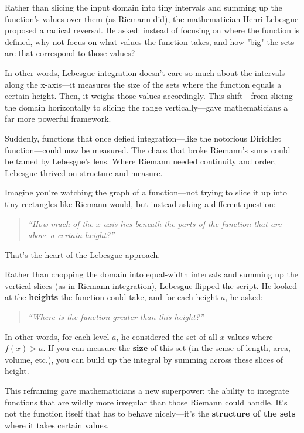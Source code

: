 Rather than slicing the input domain into tiny intervals and summing up the function’s values over them (as Riemann did), the mathematician Henri Lebesgue proposed a radical reversal. He asked: instead of focusing on where the function is defined, why not focus on what values the function takes, and how "big" the sets are that correspond to those values?

In other words, Lebesgue integration doesn’t care so much about the intervals along the x-axis—it measures the size of the sets where the function equals a certain height. Then, it weighs those values accordingly. This shift—from slicing the domain horizontally to slicing the range vertically—gave mathematicians a far more powerful framework.

Suddenly, functions that once defied integration—like the notorious Dirichlet function—could now be measured. The chaos that broke Riemann’s sums could be tamed by Lebesgue’s lens. Where Riemann needed continuity and order, Lebesgue thrived on structure and measure.

Imagine you're watching the graph of a function—not trying to slice it up into tiny rectangles like Riemann would, but instead asking a different question:  

\begin{quote}
\emph{“How much of the $x$-axis lies beneath the parts of the function that are above a certain height?”}
\end{quote}

That’s the heart of the Lebesgue approach.

Rather than chopping the domain into equal-width intervals and summing up the vertical slices (as in Riemann integration), Lebesgue flipped the script. He looked at the \textbf{heights} the function could take, and for each height \( a \), he asked:
\begin{quote}
\emph{“Where is the function greater than this height?”}
\end{quote}

In other words, for each level \( a \), he considered the set of all \( x \)-values where \( f(x) > a \). If you can measure the \textbf{size} of this set (in the sense of length, area, volume, etc.), you can build up the integral by summing across these slices of height.

This reframing gave mathematicians a new superpower: the ability to integrate functions that are wildly more irregular than those Riemann could handle. It’s not the function itself that has to behave nicely—it’s the \textbf{structure of the sets} where it takes certain values.

